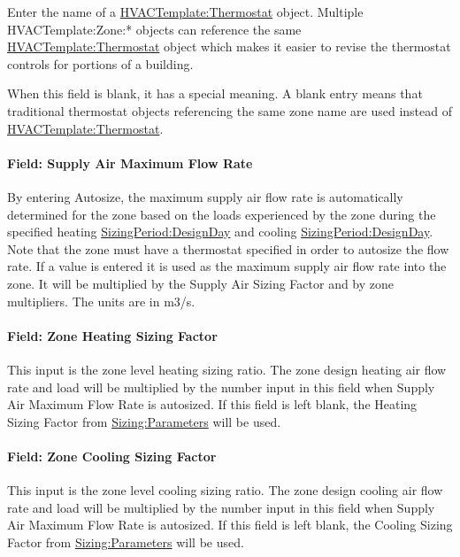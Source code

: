 Enter the name of a \hyperref[hvactemplatethermostat]{HVACTemplate:Thermostat} object. Multiple HVACTemplate:Zone:* objects can reference the same \hyperref[hvactemplatethermostat]{HVACTemplate:Thermostat} object which makes it easier to revise the thermostat controls for portions of a building.

When this field is blank, it has a special meaning. A blank entry means that traditional thermostat objects referencing the same zone name are used instead of \hyperref[hvactemplatethermostat]{HVACTemplate:Thermostat}.

\paragraph{Field: Supply Air Maximum Flow Rate}\label{field-supply-air-maximum-flow-rate}

By entering Autosize, the maximum supply air flow rate is automatically determined for the zone based on the loads experienced by the zone during the specified heating \hyperref[sizingperioddesignday]{SizingPeriod:DesignDay} and cooling \hyperref[sizingperioddesignday]{SizingPeriod:DesignDay}. Note that the zone must have a thermostat specified in order to autosize the flow rate. If a value is entered it is used as the maximum supply air flow rate into the zone. It will be multiplied by the Supply Air Sizing Factor and by zone multipliers. The units are in m3/s.

\paragraph{Field: Zone Heating Sizing Factor}\label{field-zone-heating-sizing-factor-1}

This input is the zone level heating sizing ratio. The zone design heating air flow rate and load will be multiplied by the number input in this field when Supply Air Maximum Flow Rate is autosized. If this field is left blank, the Heating Sizing Factor from \hyperref[sizingparameters]{Sizing:Parameters} will be used.

\paragraph{Field: Zone Cooling Sizing Factor}\label{field-zone-cooling-sizing-factor-000}

This input is the zone level cooling sizing ratio. The zone design cooling air flow rate and load will be multiplied by the number input in this field when Supply Air Maximum Flow Rate is autosized. If this field is left blank, the Cooling Sizing Factor from \hyperref[sizingparameters]{Sizing:Parameters} will be used.

